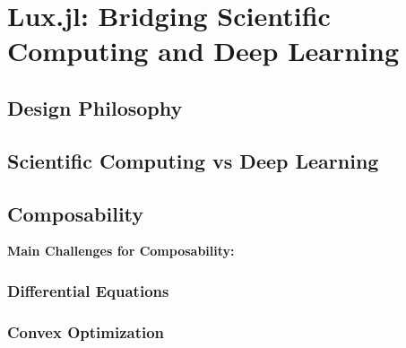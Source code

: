 \chapter{Lux.jl: Bridging Scientific Computing and Deep Learning}
\label{chapter:lux_bridging_scientific_computing_and_deep_learning}

\section{Design Philosophy}
\label{sec:design_philosophy}

\section{Scientific Computing vs Deep Learning}
\label{sec:scientific_computing_vs_deep_learning}

\section{Composability}
\label{sec:composability}

\textbf{Main Challenges for Composability:}

\subsection{Differential Equations}
\label{subsec:differential_equations}

\subsection{Convex Optimization}
\label{subsec:convex_optimization}

\subsection{}
\label{subsec:}

